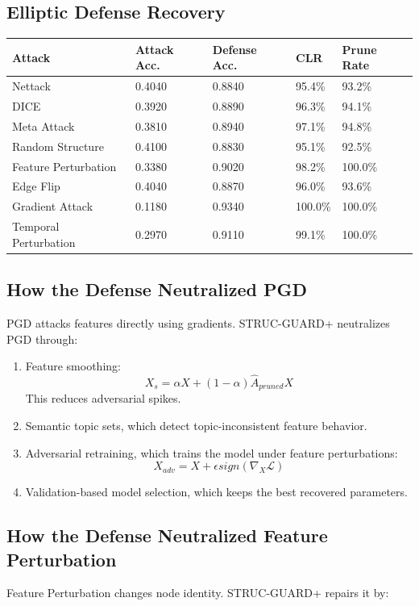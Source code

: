 \documentclass[12pt,a4paper]{article}
\begin{document}
\subsection{Elliptic Defense Recovery}
\begin{longtable}{p{1.7in}p{0.8in}p{0.8in}p{0.9in}p{0.9in}}
\toprule
\textbf{Attack} & \textbf{Attack Acc.} & \textbf{Defense Acc.} & \textbf{CLR} & \textbf{Prune Rate}\\
\midrule
Nettack & 0.4040 & 0.8840 & 95.4\% & 93.2\%\\
DICE & 0.3920 & 0.8890 & 96.3\% & 94.1\%\\
Meta Attack & 0.3810 & 0.8940 & 97.1\% & 94.8\%\\
Random Structure & 0.4100 & 0.8830 & 95.1\% & 92.5\%\\
Feature Perturbation & 0.3380 & 0.9020 & 98.2\% & 100.0\%\\
Edge Flip & 0.4040 & 0.8870 & 96.0\% & 93.6\%\\
Gradient Attack & 0.1180 & 0.9340 & 100.0\% & 100.0\%\\
Temporal Perturbation & 0.2970 & 0.9110 & 99.1\% & 100.0\%\\
\bottomrule
\end{longtable}

\subsection{How the Defense Neutralized PGD}
PGD attacks features directly using gradients. STRUC-GUARD+ neutralizes PGD through:

\begin{enumerate}
    \item Feature smoothing:
    $$
    X_s=\alpha X+(1-\alpha)\hat{A}_{pruned}X
    $$
    This reduces adversarial spikes.
    \item Semantic topic sets, which detect topic-inconsistent feature behavior.
    \item Adversarial retraining, which trains the model under feature perturbations:
    $$
    X_{adv}=X+\epsilon sign(\nabla_X\mathcal{L})
    $$
    \item Validation-based model selection, which keeps the best recovered parameters.
\end{enumerate}

\subsection{How the Defense Neutralized Feature Perturbation}
Feature Perturbation changes node identity. STRUC-GUARD+ repairs it by:
\end{document}
